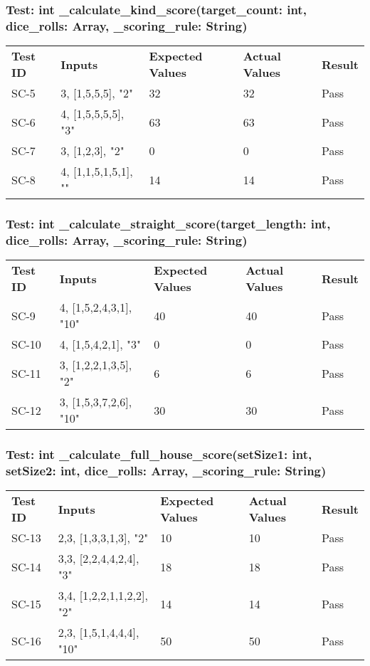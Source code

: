 \documentclass[12pt, titlepage]{article}
\begin{document}
\subsubsection{Test: int \_calculate\_kind\_score(target\_count: int, dice\_rolls: Array, \_scoring\_rule: String)}
\begin{tabularx}{\textwidth}{|p{2cm}|p{3.5cm}|p{4cm}|p{4cm}|p{1.5cm}|}
    \cline{1-5}
    \textbf{Test ID} & \textbf{Inputs} & \textbf{Expected Values} & \textbf{Actual Values} & \textbf{Result} \\
    \cline{1-5}
    SC-5 & 3, [1,5,5,5], "2" & 32 & 32 & Pass \\
    \cline{1-5}
    SC-6 & 4, [1,5,5,5,5], "3" & 63 & 63 & Pass \\
    \cline{1-5}
    SC-7 & 3, [1,2,3], "2" & 0 & 0 & Pass \\
    \cline{1-5}
    SC-8 & 4, [1,1,5,1,5,1], "" & 14 & 14 & Pass \\
    \cline{1-5}
\end{tabularx}

\subsubsection{Test: int \_calculate\_straight\_score(target\_length: int, dice\_rolls: Array, \_scoring\_rule: String)}
\begin{tabularx}{\textwidth}{|p{2cm}|p{3.5cm}|p{4cm}|p{4cm}|p{1.5cm}|}
    \cline{1-5}
    \textbf{Test ID} & \textbf{Inputs} & \textbf{Expected Values} & \textbf{Actual Values} & \textbf{Result} \\
    \cline{1-5}
    SC-9 & 4, [1,5,2,4,3,1], "10" & 40 & 40 & Pass \\
    \cline{1-5}
    SC-10 & 4, [1,5,4,2,1], "3" & 0 & 0 & Pass \\
    \cline{1-5}
    SC-11 & 3, [1,2,2,1,3,5], "2" & 6 & 6 & Pass \\
    \cline{1-5}
    SC-12 & 3, [1,5,3,7,2,6], "10" & 30 & 30 & Pass \\
    \cline{1-5}
\end{tabularx}

\subsubsection{Test: int \_calculate\_full\_house\_score(setSize1: int, setSize2: int, dice\_rolls: Array, \_scoring\_rule: String)}
\begin{tabularx}{\textwidth}{|p{2cm}|p{3.5cm}|p{4cm}|p{4cm}|p{1.5cm}|}
    \cline{1-5}
    \textbf{Test ID} & \textbf{Inputs} & \textbf{Expected Values} & \textbf{Actual Values} & \textbf{Result} \\
    \cline{1-5}
    SC-13 & 2,3, [1,3,3,1,3], "2" & 10 & 10 & Pass \\
    \cline{1-5}
    SC-14 & 3,3, [2,2,4,4,2,4], "3" & 18 & 18 & Pass \\
    \cline{1-5}
    SC-15 & 3,4, [1,2,2,1,1,2,2], "2" & 14 & 14 & Pass \\
    \cline{1-5}
    SC-16 & 2,3, [1,5,1,4,4,4], "10" & 50 & 50 & Pass \\
    \cline{1-5}
\end{tabularx}
\end{document}
